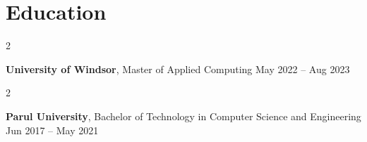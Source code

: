 \documentclass[10pt, letterpaper]{article}
\newenvironment{twocolentry}[2][]{
    \onecolentry
    \def\secondColumn{#2}
    \setcolumnwidth{\fill, 4.5 cm}
    \begin{paracol}{2}
}{
    \switchcolumn \raggedleft \secondColumn
    \end{paracol}
    \endonecolentry
} %
\begin{document}
    \section{Education}
        \begin{twocolentry}{
            May 2022 – Aug 2023
        }
            \textbf{University of Windsor}, Master of Applied Computing \end{twocolentry}

        \begin{twocolentry}{
            Jun 2017 – May 2021
        }
            \textbf{Parul University}, Bachelor of Technology in Computer Science and Engineering\end{twocolentry}
\end{document}
